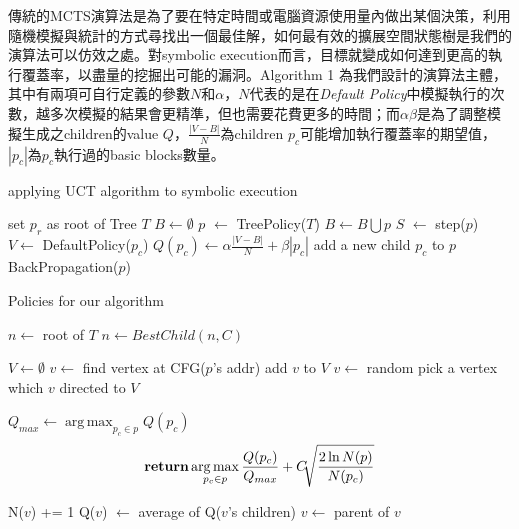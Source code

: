 \documentclass[12pt,a4paper,oneside]{book}
\DeclareMathOperator*{\argmax}{arg\,max}
\begin{document}
傳統的MCTS演算法是為了要在特定時間或電腦資源使用量內做出某個決策，利用隨機模擬與統計的方式尋找出一個最佳解，如何最有效的擴展空間狀態樹是我們的演算法可以仿效之處。對symbolic execution而言，目標就變成如何達到更高的執行覆蓋率，以盡量的挖掘出可能的漏洞。Algorithm 1 為我們設計的演算法主體，其中有兩項可自行定義的參數$N$和$\alpha$，$N$代表的是在\textit{Default Policy}中模擬執行的次數，越多次模擬的結果會更精準，但也需要花費更多的時間；而$\alpha \beta$是為了調整模擬生成之children的value $Q$，$\frac{|V-B|}{N}$為children $p_c$可能增加執行覆蓋率的期望值，$|p_c|$為$p_c$執行過的basic blocks數量。

\begin{algorithm}[h]
  \caption{applying UCT algorithm to symbolic execution}
  \begin{algorithmic}[1]
    \State set $p_r$ as root of Tree $T$
    \State $B \leftarrow \emptyset$
      \State $p$ $\leftarrow$ TreePolicy($T$)
      \State $B \leftarrow B \bigcup p$
      \State $S$ $\leftarrow$ step($p$)
      	\State $V \leftarrow$ DefaultPolicy($p_c$)
        \State $Q(p_c) \leftarrow \alpha \frac{|V-B|}{N} + \beta|p_c|$
        \State add a new child $p_c$ to $p$
      \EndFor
      \State BackPropagation($p$)
    \EndWhile
    \EndFunction
  \end{algorithmic}
\end{algorithm}

\begin{algorithm}[h]
  \caption{Policies for our algorithm}
  \begin{algorithmic}[]
    	\State $n \leftarrow$ root of $T$
            	\State {}
            \Else
            	\State $n \leftarrow BestChild(n,C)$
            \EndIf
        \EndWhile
    \EndFunction
    \item[]
    	\State $V \leftarrow \emptyset$
          \State $v \leftarrow$ find vertex at CFG($p$'s addr)
              \State add $v$ to $V$
              \State $v \leftarrow$ random pick a vertex which $v$ directed to
          \EndFor
        \EndFor
        \State \Return $V$
    \EndFunction
    \item[]
    	\State $Q_{max} \leftarrow \operatorname*{arg\,max}_{p_c \in p} Q(p_c)$
    	\State \[ \Return \argmax_{p_c \in p} \frac{Q(p_c)}{Q_{max}}+C\sqrt[]{\frac{2\ln N(p)}{N(p_c)}} \]
    \EndFunction
    \item[]
    	\State N($v$) += 1
		\State Q($v$) $\leftarrow$ average of Q($v$'s children)
    \State $v \leftarrow$ parent of $v$
    \EndWhile
    \EndFunction
  \end{algorithmic}
\end{algorithm}
  
\end{document}
